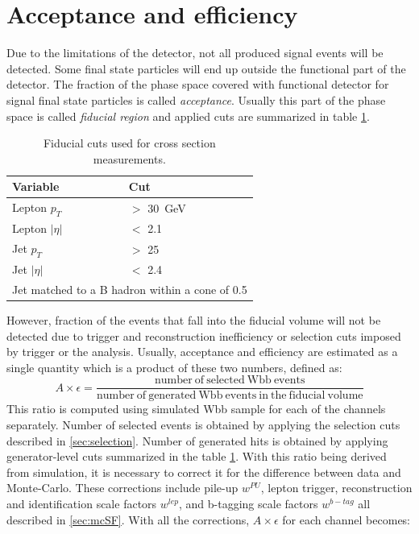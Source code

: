 
\section{Acceptance and efficiency}
\label{sec:AE}
    
Due to the limitations of the detector, not all produced signal events will be detected. Some final state particles will end up outside the functional part of the detector. The fraction of the phase space covered with functional detector for signal final state particles is called \textit{acceptance}. Usually this part of the phase space is called \textit{fiducial region} and applied cuts are summarized in table \ref{tab:fiducial}.             
\begin{table}[!htb]
\begin{center}
   \begin{tabular} {l l} \hline \hline
        Variable         & Cut \\
        \hline
        Lepton $p_T$    & $>$ 30\ GeV \\
        Lepton $|\eta|$   & $<$ 2.1 \\
        Jet $p_T$       & $>$ 25  \\
        Jet $|\eta|$      & $<$ 2.4 \\
        \multicolumn{2}{l}{
        Jet matched to a B hadron within a cone of 0.5} \\
        \hline\hline
   \end{tabular}
\caption{Fiducial cuts used for cross section measurements.}
\label{tab:fiducial}
\end{center}
\end{table}
However, fraction of the events that fall into the fiducial volume will not be detected due to trigger and reconstruction inefficiency or selection cuts imposed by trigger or the analysis. Usually, acceptance and efficiency are estimated as a single quantity which is a product of these two numbers, defined as:
\begin{equation}
A\times \epsilon=\frac{\mathrm{number\ of\ selected\ Wbb\ events}}{\mathrm{number\ of\ generated\ Wbb\ events\ in\ the\ fiducial\ volume}}
\end{equation}
This ratio is computed using simulated Wbb sample for each of the channels separately. Number of selected events is obtained by applying the selection cuts described in \ref{sec:selection}. Number of generated hits is obtained by applying generator-level cuts summarized in the table \ref{tab:fiducial}. With this ratio being derived from simulation, it is necessary to correct it for the difference between data and Monte-Carlo. These corrections include pile-up  $w^{PU}$, lepton trigger, reconstruction and identification scale factors $w^{lep}$, and b-tagging scale factors $w^{b-tag}$ all described in \ref{sec:mcSF}. With all the corrections, $A\times \epsilon$ for each channel becomes:
